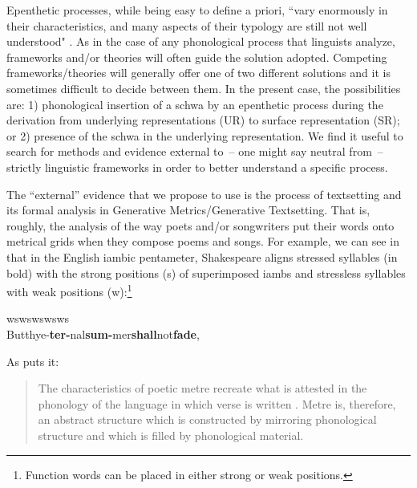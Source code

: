 \documentclass[output=paper,colorlinks,citecolor=brown]{langscibook}
\begin{document}
Epenthetic processes, while being easy to define a priori, ``vary enormously in their characteristics, and many aspects of their typology are still not well understood" \citep[1]{Hall2011}. As in the case of any phonological process that linguists analyze, frameworks and/or theories will often guide the solution adopted. Competing frameworks/theories will generally offer one of two different solutions and it is sometimes difficult to decide between them.  In the present case, the possibilities are: 1) phonological insertion of a schwa by an epenthetic process during the derivation from underlying representations (UR) to surface representation (SR); or 2) presence of the schwa in the underlying representation.  We find it useful to search for methods and evidence external to~-- one might say neutral from~-- strictly linguistic frameworks in order to better understand a specific process.

The “external” evidence that we propose to use is the process of textsetting and its formal analysis in Generative Metrics/Generative Textsetting. That is, roughly, the analysis of the way poets and/or songwriters put their words onto metrical grids when they compose poems and songs. For example, we can see in  that in the English iambic pentameter, Shakespeare aligns stressed syllables (in bold) with the strong positions (s) of superimposed iambs and stressless syllables with weak positions (w):\footnote{Function words can be placed in either strong or weak positions.}

\begin{exe}
    \ex \label{baronian:shake} w\tab  s\tab   {\textbar}\tab  w\tab  s\tab   {\textbar}\tab  w\tab  s\tab   {\textbar}\tab  w\tab  s\tab   {\textbar}\tab  w\tab  s\tab\\
    But\tab	thy\tab \tab		 e-\tab	\textbf{ter-}\tab \tab		nal\tab 	\textbf{sum-}\tab 	mer\tab \textbf{shall}\tab \tab 		not\tab 	\textbf{fade},
\end{exe}


\noindent As \citet[1]{desisto2020} puts it:

\begin{quote}
The characteristics of poetic metre recreate what is attested in the phonology of the language in which verse is written \citep{Kiparsky1973, Hayes1989meter, Fabb1997, GolstonRiad1999}. Metre is, therefore, an abstract structure which is constructed by mirroring phonological structure and which is filled by phonological material. 
\end{quote}
\end{document}
